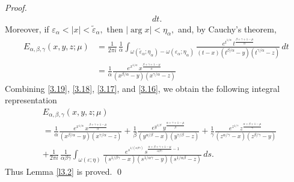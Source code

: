 \documentclass[10pt,a4paper]{amsart}
\begin{document}
\begin{proof}
\begin{equation}
\begin{aligned}
{}
\,dt.\end{aligned}\end{equation}
Moreover, if
$
\varepsilon_\alpha<|x|<\widetilde{\varepsilon}_{\alpha},
$
then
$
|\arg x|<\eta_\alpha,
$
and, by Cauchy's theorem,
\begin{equation}\label{3.19}\begin{aligned}
E_{\alpha,\beta,\gamma}(x,y,z;\mu)
&=
\frac{1}{2\pi i}\,
\frac{1}{\alpha}
\int_{\omega(\widetilde{\varepsilon}_{\alpha};\eta_\alpha)-\omega(\varepsilon_{\alpha};\eta_\alpha)}
\frac{
e^{t^{1/\alpha}}
\,t^{\frac{\beta+\gamma+1-\mu}{\alpha}}
}
{
(t-x)(t^{\beta/\alpha}-y)(t^{\gamma/\alpha}-z)
}
\,dt\\
&=\frac{1}{\alpha}\frac{
e^{x^{1/\alpha}}
\,x^{\frac{\beta+\gamma+1-\mu}{\alpha}}}
{(x^{\beta/\alpha}-y)(x^{\gamma/\alpha}-z)}\end{aligned}
\end{equation}
Combining \eqref{3.19}, \eqref{3.18}, \eqref{3.17}, and \eqref{3.16}, we obtain
 the following integral representation 
\begin{equation}\label{3.20}\begin{aligned}
&E_{\alpha,\beta,\gamma}(x,y,z;\mu)\\
&=\frac{1}{\alpha}\frac{
e^{x^{1/\alpha}}
\,x^{\frac{\beta+\gamma+1-\mu}{\alpha}}}
{(x^{\beta/\alpha}-y)(x^{\gamma/\alpha}-z)}+\frac{1}{\beta}\frac{
e^{y^{1/\beta}}
\,y^{\frac{\alpha+\gamma+1-\mu}{\beta}}}
{(y^{\alpha/\beta}-x)(y^{\gamma/\beta}-z)}+\frac{1}{\gamma}\frac{
e^{z^{1/\gamma}}
\,z^{\frac{\alpha+\beta+1-\mu}{\gamma}}}
{(z^{\alpha/\gamma}-x)(z^{\beta/\gamma}-y)}\\
&+
\frac{1}{2\pi i}\,
\frac{1}{\alpha\beta\gamma}
\int_{\omega(\varepsilon;\eta)}
\frac{
e^{s^{1/(\alpha\beta\gamma)}}
\,s^{\frac{\alpha+\beta+\gamma+1-\mu}{\alpha\beta\gamma}-1}
}
{
(s^{1/\beta\gamma}-x)(s^{1/\alpha\gamma}-y)(s^{1/\alpha\beta}-z)
}
\,ds.\end{aligned}\end{equation}
Thus Lemma \ref{l3.2} is proved. \qed
\end{proof}
\end{document}
